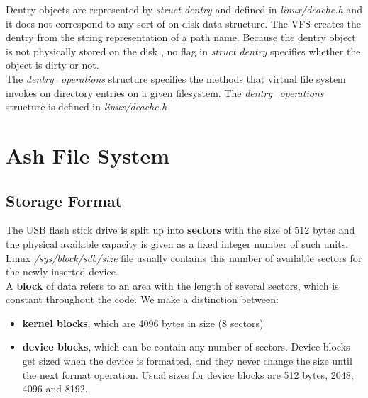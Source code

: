 \documentclass[conference]{IEEEtran}
\begin{document}
Dentry objects are represented by {\em struct dentry} and defined in {\em linux/dcache.h} and it does not 
correspond to any sort of on-disk data structure. The VFS creates the dentry from the string representation of 
a path name. Because the dentry object is not physically stored on the disk , no flag in {\em struct dentry}
specifies whether the object is dirty or not. \\

The {\em dentry\_operations}  structure specifies the methods that virtual file system invokes on directory entries on a 
given filesystem. The {\em dentry\_operations} structure is defined in {\em linux/dcache.h} 


\section{Ash File System}

\subsection{Storage Format}
The USB flash stick drive is split up into {\bf sectors} with the size of 512 bytes and the physical available
capacity is given as a fixed integer number of such units. Linux {\em /sys/block/sdb/size} file usually contains 
this number of available sectors for the newly inserted device.\\

A {\bf block} of data refers to an area with the length of
several sectors, which is constant throughout the code. We make a distinction between:
\begin{itemize}
\item
{\bf kernel blocks}, which are 4096 bytes in size (8 sectors)
\item
{\bf device blocks}, which can be contain any number of sectors. Device blocks get sized when the device is formatted, and
they never change the size until the next format operation. Usual sizes for device blocks are 512 bytes, 2048, 4096 and 8192.
\end{itemize}
\end{document}
